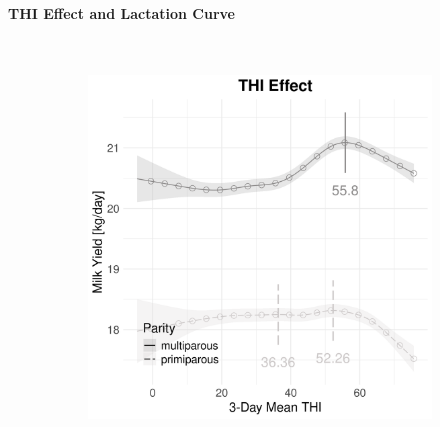 \paragraph{THI Effect and Lactation Curve} \quad \\
\begin{figure}[H]
    \centering
    \begin{subfigure}[b]{0.45\textwidth}
        \centering
        \includegraphics[width=\textwidth]{thesis/figures/models/milk/before2010/si_milk_before2010/si_milk_before2010_marginal_thi_milk_combined.png}
    \end{subfigure}
    \hspace{0.05\textwidth} %
    \begin{subfigure}[b]{0.45\textwidth}
        \centering

\end{subfigure}
\end{figure}
